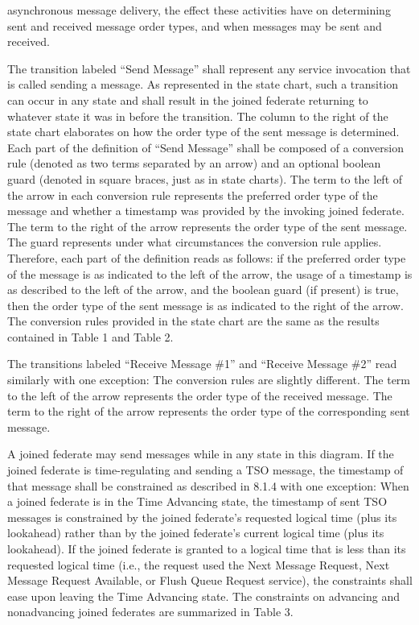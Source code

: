 \clearpage

\begin{compactstdpage}

    asynchronous message delivery, the effect these activities have on determining sent and received message order types, and when messages may be sent and received.

    The transition labeled ``Send Message'' shall represent any service invocation that is called sending a message. As represented in the state chart, such a transition can occur in any state and shall result in the joined federate returning to whatever state it was in before the transition. The column to the right of the state chart elaborates on how the order type of the sent message is determined. Each part of the definition of ``Send Message'' shall be composed of a conversion rule (denoted as two terms separated by an arrow) and an optional boolean guard (denoted in square braces, just as in state charts). The term to the left of the arrow in each conversion rule represents the preferred order type of the message and whether a timestamp was provided by the invoking joined federate. The term to the right of the arrow represents the order type of the sent message. The guard represents under what circumstances the conversion rule applies. Therefore, each part of the definition reads as follows: if the preferred order type of the message is as indicated to the left of the arrow, the usage of a timestamp is as described to the left of the arrow, and the boolean guard (if present) is true, then the order type of the sent message is as indicated to the right of the arrow. The conversion rules provided in the state chart are the same as the results contained in Table 1 and Table 2.

    The transitions labeled ``Receive Message \#1'' and ``Receive Message \#2'' read similarly with one exception: The conversion rules are slightly different. The term to the left of the arrow represents the order type of the received message. The term to the right of the arrow represents the order type of the corresponding sent message.

    A joined federate may send messages while in any state in this diagram. If the joined federate is time-regulating and sending a TSO message, the timestamp of that message shall be constrained as described in 8.1.4 with one exception: When a joined federate is in the Time Advancing state, the timestamp of sent TSO messages is constrained by the joined federate's requested logical time (plus its lookahead) rather than by the joined federate's current logical time (plus its lookahead). If the joined federate is granted to a logical time that is less than its requested logical time (i.e., the request used the Next Message Request, Next Message Request Available, or Flush Queue Request service), the constraints shall ease upon leaving the Time Advancing state. The constraints on advancing and nonadvancing joined federates are summarized in Table 3.


\end{compactstdpage}
